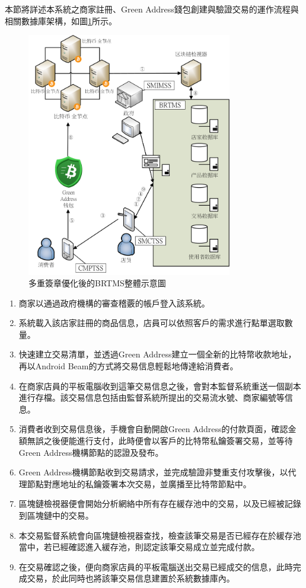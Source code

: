本節將詳述本系統之商家註冊、Green Address錢包創建與驗證交易的運作流程與相關數據庫架構，如圖\ref{gabpcss}所示。

	\begin{figure}[!htbp]
		\centering
		\includegraphics[width = 0.8\textwidth]{gabpcss.png}
		\caption{多重簽章優化後的BRTMS整體示意圖}\label{gabpcss}
	\end{figure}

	\begin{enumerate}
		\item 商家以通過政府機構的審查稽覈的帳戶登入該系統。
		\item 系統載入該店家註冊的商品信息，店員可以依照客戶的需求進行點單選取數量。
		\item 快速建立交易清單，並透過Green Address建立一個全新的比特幣收款地址，再以Android Beam的方式將交易信息輕鬆地傳達給消費者。
		\item 在商家店員的平板電腦收到這筆交易信息之後，會對本監督系統重送一個副本進行存檔。該交易信息包括由監督系統所提出的交易流水號、商家編號等信息。
		\item 消費者收到交易信息後，手機會自動開啟Green Address的付款頁面，確認金額無誤之後便能進行支付，此時便會以客戶的比特幣私鑰簽署交易，並等待Green Address機構節點的認證及發布。
		\item Green Address機構節點收到交易請求，並完成驗證非雙重支付攻擊後，以代理節點對應地址的私鑰簽署本次交易，並廣播至比特幣節點中。
		\item 區塊鏈檢視器便會開始分析網絡中所有存在緩存池中的交易，以及已經被記錄到區塊鏈中的交易。
		\item 本交易監督系統會向區塊鏈檢視器查找，檢查該筆交易是否已經存在於緩存池當中，若已經確認進入緩存池，則認定該筆交易成立並完成付款。
		\item 在交易確認之後，便向商家店員的平板電腦送出交易已經成交的信息，此時完成交易，於此同時也將該筆交易信息建置於系統數據庫內。
	\end{enumerate}
